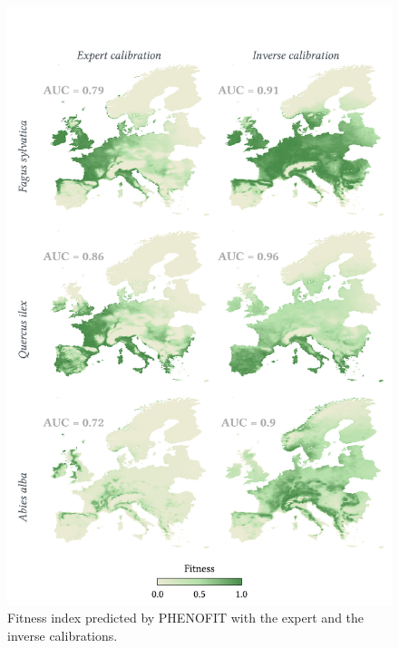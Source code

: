 \documentclass[11pt,]{article}
\begin{document}
\begin{figure}[H]

{\centering \includegraphics{figs/phenofit_output_maps} 

}

\caption{Fitness index predicted by PHENOFIT with the expert and the inverse calibrations.}\label{fig:phenofit_output_maps}
\end{figure}
\end{document}
